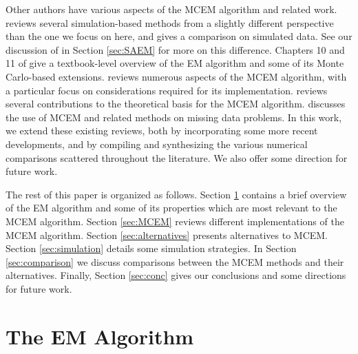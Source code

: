 \documentclass[ss]{imsart}
\theoremstyle{plain}
\theoremstyle{definition}
\theoremstyle{remark}
\begin{document}


Other authors have various aspects of the MCEM algorithm and related work. \citet{Cel95} reviews several simulation-based methods from a slightly different perspective than the one we focus on here, and gives a comparison on simulated data. See our discussion of \citet{Cel95} in Section \ref{sec:SAEM} for more on this difference. Chapters 10 and 11 of \citet{Cap05} give a textbook-level overview of the EM algorithm and some of its Monte Carlo-based extensions. \citet{Jan06II} reviews numerous aspects of the MCEM algorithm, with a particular focus on considerations required for its implementation. \citet{Nea13} reviews several contributions to the theoretical basis for the MCEM algorithm. \citet{Zho20} discusses the use of MCEM and related methods on missing data problems. In this work, we extend these existing reviews, both by incorporating some more recent developments, and by compiling and synthesizing the various numerical comparisons scattered throughout the literature. We also offer some direction for future work.

The rest of this paper is organized as follows. Section \ref{sec:EM} contains a brief overview of the EM algorithm and some of its properties which are most relevant to the MCEM algorithm. Section \ref{sec:MCEM} reviews different implementations of the MCEM algorithm. Section \ref{sec:alternatives} presents alternatives to MCEM. Section \ref{sec:simulation} details some simulation strategies. In Section \ref{sec:comparison} we discuss comparisons between the MCEM methods and their alternatives. Finally, Section \ref{sec:conc} gives our conclusions and some directions for future work.



\section{The EM Algorithm}
\label{sec:EM}
\end{document}
